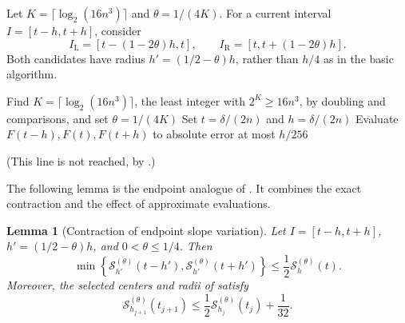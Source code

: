 \documentclass[10pt,a4paper]{article}
\newtheorem{lemma}{Lemma}[section]
\begin{document}
Let $K=\lceil\log_2(16n^3)\rceil$ and $\theta=1/(4K)$.
For a current interval $I=[t-h,t+h]$, consider
\[
I_{\mathrm L}=[t-(1-2\theta)h,t],
\qquad
I_{\mathrm R}=[t,t+(1-2\theta)h].
\]
Both candidates have radius $h'=(1/2-\theta)h$, rather than $h/4$
as in the basic algorithm.

\begin{algorithm}[t]

\caption{Improved selection of a separating perturbation}
\label{alg:selection}
\DontPrintSemicolon
{}

Find $K=\lceil\log_2(16n^3)\rceil$, the least integer
with $2^K\geq16n^3$, by doubling and comparisons, and
set $\theta=1/(4K)$\;
Set $t=\delta/(2n)$ and $h=\delta/(2n)$\;
Evaluate $F(t-h),F(t),F(t+h)$ to absolute error at most $h/256$\;

(This line is not reached, by .)\;
\end{algorithm}


The following lemma is the endpoint analogue of
. It combines the exact contraction
and the effect of approximate evaluations.

\begin{lemma}[Contraction of endpoint slope variation]
\label{lem:potential-contraction}
\label{lem:potential-inexact}
Let $I=[t-h,t+h]$, $h'=(1/2-\theta)h$, and
$0<\theta\leq1/4$. Then
\begin{equation}\label{eq:potential-contraction}
\boxed{
\min\left\{
\mathcal S_{h'}^{(\theta)}(t-h'),
\mathcal S_{h'}^{(\theta)}(t+h')
\right\}
\leq\frac12\mathcal S_h^{(\theta)}(t).
}
\end{equation}
Moreover, the selected centers and radii of
 satisfy
\begin{equation}\label{eq:potential-inexact-contraction}
\boxed{
\mathcal S_{h_{j+1}}^{(\theta)}(t_{j+1})
\leq\frac12\mathcal S_{h_j}^{(\theta)}(t_j)+\frac1{32}.
}
\end{equation}
\end{lemma}
\end{document}
